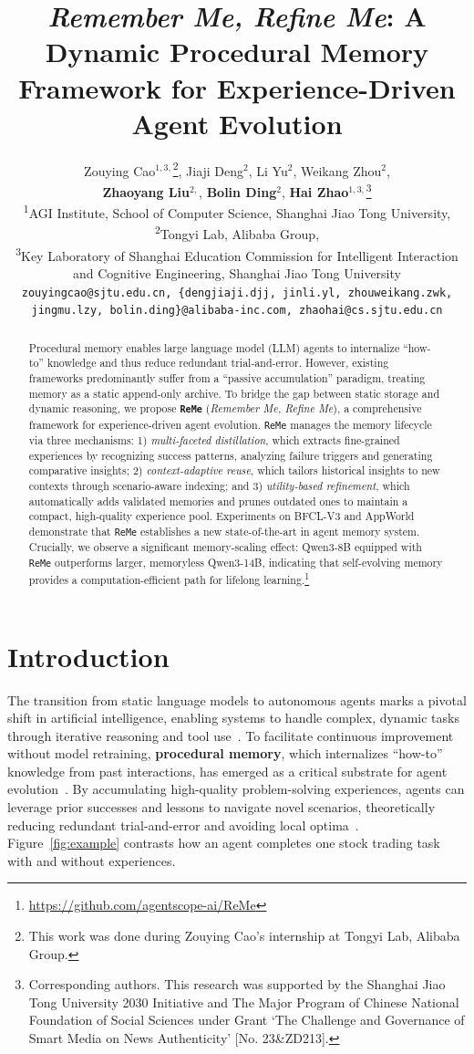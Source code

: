 \documentclass[11pt]{article}
\title{\textit{Remember Me, Refine Me}: A Dynamic Procedural Memory \\Framework for Experience-Driven Agent Evolution}
\author{Zouying Cao$^{1,3,}$\thanks{This work was done during Zouying Cao’s internship at Tongyi Lab,
Alibaba Group.}, Jiaji Deng$^{2}$, Li Yu$^{2}$, Weikang Zhou$^{2}$, \\
\textbf{Zhaoyang Liu}$^{2,}$\footnotemark[2], \textbf{Bolin Ding}$^{2}$, \textbf{Hai Zhao}$^{1,3,}$\thanks{Corresponding authors. This research was supported by the Shanghai Jiao Tong University 2030 Initiative and The Major Program of Chinese National Foundation of Social Sciences under Grant ‘The Challenge and Governance of Smart Media on News Authenticity’ [No. 23\&ZD213].} \\
\textsuperscript{1}AGI Institute, School of Computer Science, Shanghai Jiao Tong University, \\
\textsuperscript{2}Tongyi Lab, Alibaba Group, \\
\textsuperscript{3}Key Laboratory of Shanghai Education Commission for Intelligent Interaction\\ and Cognitive Engineering, Shanghai Jiao Tong University \\
\normalsize{\texttt{zouyingcao@sjtu.edu.cn, \{dengjiaji.djj,  jinli.yl, zhouweikang.zwk,}} \\
\normalsize{\texttt{jingmu.lzy, bolin.ding\}@alibaba-inc.com, zhaohai@cs.sjtu.edu.cn}} \\
}
\newcommand{\ours}{\texttt{ReMe}}
\begin{document}
\maketitle

% 
% 

% 
% 


\begin{abstract}
Procedural memory enables large language model (LLM) agents to internalize ``how-to'' knowledge and thus reduce redundant trial-and-error. 
However, existing frameworks predominantly suffer from a ``passive accumulation'' paradigm, treating memory as a static append-only archive. 
To bridge the gap between static storage and dynamic reasoning, we propose \textbf{\ours} (\textit{Remember Me, Refine Me}), a comprehensive framework for experience-driven agent evolution. 
{\ours} manages the memory lifecycle via three mechanisms: 
1) \textit{multi-faceted distillation}, which extracts fine-grained experiences by recognizing success patterns, analyzing failure triggers and generating comparative insights; 
2) \textit{context-adaptive reuse}, which tailors historical insights to new contexts through scenario-aware indexing; 
and 3) \textit{utility-based refinement}, which automatically adds validated memories and prunes outdated ones to maintain a compact, high-quality experience pool. 
Experiments on BFCL-V3 and AppWorld demonstrate that {\ours} establishes a new state-of-the-art in agent memory system. 
Crucially, we observe a significant memory-scaling effect: Qwen3-8B equipped with {\ours} outperforms larger, memoryless Qwen3-14B, indicating that self-evolving memory provides a computation-efficient path for lifelong learning.\footnote{\url{https://github.com/agentscope-ai/ReMe}}
\end{abstract}


\section{Introduction}
The transition from static language models to autonomous agents marks a pivotal shift in artificial intelligence, enabling systems to handle complex, dynamic tasks through iterative reasoning and tool use~\citep{tao2024survey,gao2025survey,fang2025comprehensive}. 
To facilitate continuous improvement without model retraining, \textbf{procedural memory}, which internalizes ``how-to'' knowledge from past interactions, has emerged as a critical substrate for agent evolution~\citep{zhang2025survey,xu2025mem}. 
By accumulating high-quality problem-solving experiences, agents can leverage prior successes and lessons to navigate novel scenarios, theoretically reducing redundant trial-and-error and avoiding local optima~\citep{wang2025mirix,chen2025swe}. 
Figure~\ref{fig:example} contrasts how an agent completes one stock trading task with and without experiences.
\end{document}
